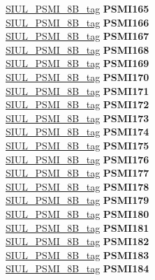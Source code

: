 \begin{DoxyCompactItemize}
\begin{tabbing}
\>\>\mbox{\hyperlink{unionSIUL__PSMI__8B__tag}{SIUL\_PSMI\_8B\_tag}} {\bfseries PSMI165}\\
\>\>\mbox{\hyperlink{unionSIUL__PSMI__8B__tag}{SIUL\_PSMI\_8B\_tag}} {\bfseries PSMI166}\\
\>\>\mbox{\hyperlink{unionSIUL__PSMI__8B__tag}{SIUL\_PSMI\_8B\_tag}} {\bfseries PSMI167}\\
\>\>\mbox{\hyperlink{unionSIUL__PSMI__8B__tag}{SIUL\_PSMI\_8B\_tag}} {\bfseries PSMI168}\\
\>\>\mbox{\hyperlink{unionSIUL__PSMI__8B__tag}{SIUL\_PSMI\_8B\_tag}} {\bfseries PSMI169}\\
\>\>\mbox{\hyperlink{unionSIUL__PSMI__8B__tag}{SIUL\_PSMI\_8B\_tag}} {\bfseries PSMI170}\\
\>\>\mbox{\hyperlink{unionSIUL__PSMI__8B__tag}{SIUL\_PSMI\_8B\_tag}} {\bfseries PSMI171}\\
\>\>\mbox{\hyperlink{unionSIUL__PSMI__8B__tag}{SIUL\_PSMI\_8B\_tag}} {\bfseries PSMI172}\\
\>\>\mbox{\hyperlink{unionSIUL__PSMI__8B__tag}{SIUL\_PSMI\_8B\_tag}} {\bfseries PSMI173}\\
\>\>\mbox{\hyperlink{unionSIUL__PSMI__8B__tag}{SIUL\_PSMI\_8B\_tag}} {\bfseries PSMI174}\\
\>\>\mbox{\hyperlink{unionSIUL__PSMI__8B__tag}{SIUL\_PSMI\_8B\_tag}} {\bfseries PSMI175}\\
\>\>\mbox{\hyperlink{unionSIUL__PSMI__8B__tag}{SIUL\_PSMI\_8B\_tag}} {\bfseries PSMI176}\\
\>\>\mbox{\hyperlink{unionSIUL__PSMI__8B__tag}{SIUL\_PSMI\_8B\_tag}} {\bfseries PSMI177}\\
\>\>\mbox{\hyperlink{unionSIUL__PSMI__8B__tag}{SIUL\_PSMI\_8B\_tag}} {\bfseries PSMI178}\\
\>\>\mbox{\hyperlink{unionSIUL__PSMI__8B__tag}{SIUL\_PSMI\_8B\_tag}} {\bfseries PSMI179}\\
\>\>\mbox{\hyperlink{unionSIUL__PSMI__8B__tag}{SIUL\_PSMI\_8B\_tag}} {\bfseries PSMI180}\\
\>\>\mbox{\hyperlink{unionSIUL__PSMI__8B__tag}{SIUL\_PSMI\_8B\_tag}} {\bfseries PSMI181}\\
\>\>\mbox{\hyperlink{unionSIUL__PSMI__8B__tag}{SIUL\_PSMI\_8B\_tag}} {\bfseries PSMI182}\\
\>\>\mbox{\hyperlink{unionSIUL__PSMI__8B__tag}{SIUL\_PSMI\_8B\_tag}} {\bfseries PSMI183}\\
\>\>\mbox{\hyperlink{unionSIUL__PSMI__8B__tag}{SIUL\_PSMI\_8B\_tag}} {\bfseries PSMI184}\\

\end{tabbing}
\end{DoxyCompactItemize}
